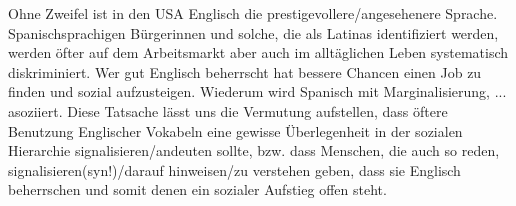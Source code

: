Ohne Zweifel ist in den USA Englisch die prestigevollere/angesehenere Sprache.
Spanischsprachigen Bürgerinnen und solche, die als Latinas identifiziert werden, werden öfter auf dem Arbeitsmarkt aber auch im alltäglichen Leben systematisch diskriminiert.
Wer gut Englisch beherrscht hat bessere Chancen einen Job zu finden und sozial aufzusteigen.
Wiederum wird Spanisch mit Marginalisierung, ... asoziiert. %
Diese Tatsache lässt uns die Vermutung aufstellen, dass öftere Benutzung Englischer Vokabeln eine gewisse Überlegenheit in der sozialen Hierarchie signalisieren/andeuten sollte, bzw. dass Menschen, die auch so reden, signalisieren(syn!)/darauf hinweisen/zu verstehen geben, dass sie Englisch beherrschen und somit denen ein sozialer Aufstieg offen steht.

\begin{comment}
  1. Versuch der Analyse:
\begin{itemize}
  \item English vocab which has more or less entered Spanish (presumably): (unisex, party, piercing, fitness, blazer, shock, fans, club, picnic)
  pons.eu findet folgende davon bei Spanish: unisex, party, piercing, fitness, blazer, shock, fan, club, pícnic
  leo.org : unisex, piercing, blazer, shock, fan, club, picnic
  dle.rae.es: unisex, party, blazer, shock, fan, club, pícnic
  \item ``look'' %
    \begin{comment}
      auch zum Thema "look": [Penny14]
      "For modern women in this axious age, the makeover is a ritual of health and devotion and social conformity. It's he central transfigurative myth of modern femininity, and it's lucrative. Playing the woman game, the game of artifice and self-annihilation, is serious business. A recent survey by shpping channel QVC claimed that the average British woman spends 2,055 pounds per year, or 11 per cent of the median full-time female salary, on maintaining and updating the way she looks. Men, by contrast, spend just 4 per cent of their salary on their appearance, most of which goes on shaving and the gym.
      [...]
      Cosmetic surgery companies plaster public transport with promises to deliver not just physical changes, but emotional ones like 'confidence'. Fashion editorials advise us to spend money we don't have on skirt suits and handbags as 'investment pieces'; you're not supposed to dress and style your body simply to please yourself but with one eye on your financial future. That skirt suit really is an 'investment' in a one-woman business whose product is you, only glossier. This is what power, health and success means to the modern, emancipated woman: terminal exhaustion and a wardrobe full of expensive disuises." (p.41-42, Fucked-up Girls)
    \end{comment}
